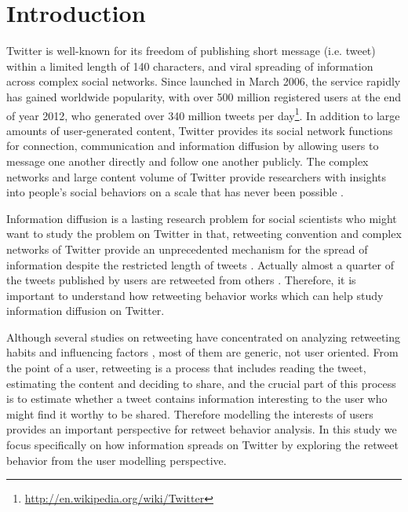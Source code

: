 \documentclass{acm_proc_article-sp}
\begin{document}
\section{Introduction}
\label{introduction}
Twitter is well-known for its freedom of publishing short message (i.e. tweet) within a limited length of 140 characters, and viral spreading of information across complex social networks.
Since launched in March 2006, the service rapidly has gained worldwide popularity, with over 500 million registered users at the end of year 2012, who generated over 340 million tweets per day\footnote{\url{http://en.wikipedia.org/wiki/Twitter}}.
In addition to large amounts of user-generated content, Twitter provides its social network functions for connection, communication and information diffusion by allowing users to message one another directly and follow one another publicly. 
The complex networks and large content volume of Twitter provide researchers with insights into people’s social behaviors on a scale that has never been possible \cite{DBLP:conf/hicss/StieglitzD12}.

Information diffusion is a lasting research problem for social scientists who might want to study the problem on Twitter in that, retweeting convention and complex networks of Twitter provide an unprecedented mechanism for the spread of information despite the restricted length of tweets \cite{Jenders:2013APV}. 
Actually almost a quarter of the tweets published by users are retweeted from others \cite{conf/cikm/YangGCTLZS10}. 
Therefore, it is important to understand how retweeting behavior works which can help study information diffusion on Twitter. 

Although several studies on retweeting have concentrated on analyzing retweeting habits and influencing factors \cite{Boyd2010,Kwak:2010TSN,Suh2010}, most of them are generic, not user oriented.
From the point of a user, retweeting is a process that includes reading the tweet, estimating the content and deciding to share, and the crucial part of this process is to estimate whether a tweet contains information interesting to the user who might find it worthy to be shared.
Therefore modelling the interests of users provides an important perspective for retweet behavior analysis. 
In this study we focus specifically on how information spreads on Twitter by exploring the retweet behavior from the user modelling perspective.
\end{document}
